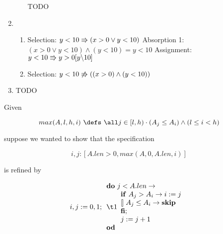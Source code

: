 \documentclass{article}
\begin{document}
\begin{enumerate}
\begin{enumerate}
        TODO

    \end{enumerate}
\item
    \begin{enumerate}
    \item 
        \DERIVE
         {Selection: $y < 10 \Rrightarrow (x > 0 \lor y < 10)$}
         {Absorption 1: $(x > 0 \lor y < 10) \land (y < 10) = y < 10$}
         {Assignment: $y < 10 \Rrightarrow y > 0[y \backslash 10]$}
        \ENDDERIVE

    \item 
        \DERIVE
        \hint{\doesntrefsto} {Selection: $y < 10 \not\Rrightarrow ((x > 0) \land (y < 10))$}

        \ENDDERIVE
    \end{enumerate}
\item TODO
\end{enumerate}

Given 

\[max(A,l,h,i) ~\defs~ \all j \in [l,h) \cdot (A_j \leq A_i) \land (l \leq i < h)\]   %

suppose we wanted to show that the specification

\[i,j:[A.len > 0, max(A,0,A.len,i)]\]

is refined by

\[i,j:=0,1;\\  %
\begin{array}{l}
\Do~ j < A.len \rightarrow\\
\t1 \begin{array}{l}   %
\If~ A_j > A_i \rightarrow i:=j\\
\Choice  A_j \leq A_i \rightarrow {\bf skip} \\
\Fi; \\
j:=j+1\\
\end{array}\\
\Od\\
\end{array}\]
\end{document}
